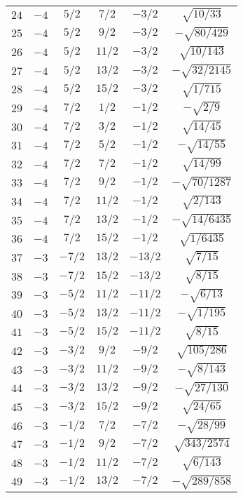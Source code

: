 \begin{table}
\begin{center}
\begin{tabular}{|c|c|c|c|c|c|}
$24$ & $-4$ & $5/2$ & $7/2$ & $-3/2$ & $\sqrt{10/33}$ \\ 
$25$ & $-4$ & $5/2$ & $9/2$ & $-3/2$ & $-\sqrt{80/429}$ \\ 
$26$ & $-4$ & $5/2$ & $11/2$ & $-3/2$ & $\sqrt{10/143}$ \\ 
$27$ & $-4$ & $5/2$ & $13/2$ & $-3/2$ & $-\sqrt{32/2145}$ \\ 
$28$ & $-4$ & $5/2$ & $15/2$ & $-3/2$ & $\sqrt{1/715}$ \\ 
$29$ & $-4$ & $7/2$ & $1/2$ & $-1/2$ & $-\sqrt{2/9}$ \\ 
$30$ & $-4$ & $7/2$ & $3/2$ & $-1/2$ & $\sqrt{14/45}$ \\ 
$31$ & $-4$ & $7/2$ & $5/2$ & $-1/2$ & $-\sqrt{14/55}$ \\ 
$32$ & $-4$ & $7/2$ & $7/2$ & $-1/2$ & $\sqrt{14/99}$ \\ 
$33$ & $-4$ & $7/2$ & $9/2$ & $-1/2$ & $-\sqrt{70/1287}$ \\ 
$34$ & $-4$ & $7/2$ & $11/2$ & $-1/2$ & $\sqrt{2/143}$ \\ 
$35$ & $-4$ & $7/2$ & $13/2$ & $-1/2$ & $-\sqrt{14/6435}$ \\ 
$36$ & $-4$ & $7/2$ & $15/2$ & $-1/2$ & $\sqrt{1/6435}$ \\ 
$37$ & $-3$ & $-7/2$ & $13/2$ & $-13/2$ & $\sqrt{7/15}$ \\ 
$38$ & $-3$ & $-7/2$ & $15/2$ & $-13/2$ & $\sqrt{8/15}$ \\ 
$39$ & $-3$ & $-5/2$ & $11/2$ & $-11/2$ & $-\sqrt{6/13}$ \\ 
$40$ & $-3$ & $-5/2$ & $13/2$ & $-11/2$ & $-\sqrt{1/195}$ \\ 
$41$ & $-3$ & $-5/2$ & $15/2$ & $-11/2$ & $\sqrt{8/15}$ \\ 
$42$ & $-3$ & $-3/2$ & $9/2$ & $-9/2$ & $\sqrt{105/286}$ \\ 
$43$ & $-3$ & $-3/2$ & $11/2$ & $-9/2$ & $-\sqrt{8/143}$ \\ 
$44$ & $-3$ & $-3/2$ & $13/2$ & $-9/2$ & $-\sqrt{27/130}$ \\ 
$45$ & $-3$ & $-3/2$ & $15/2$ & $-9/2$ & $\sqrt{24/65}$ \\ 
$46$ & $-3$ & $-1/2$ & $7/2$ & $-7/2$ & $-\sqrt{28/99}$ \\ 
$47$ & $-3$ & $-1/2$ & $9/2$ & $-7/2$ & $\sqrt{343/2574}$ \\ 
$48$ & $-3$ & $-1/2$ & $11/2$ & $-7/2$ & $\sqrt{6/143}$ \\ 
$49$ & $-3$ & $-1/2$ & $13/2$ & $-7/2$ & $-\sqrt{289/858}$ \\ 

\end{tabular}
\end{center}
\end{table}
